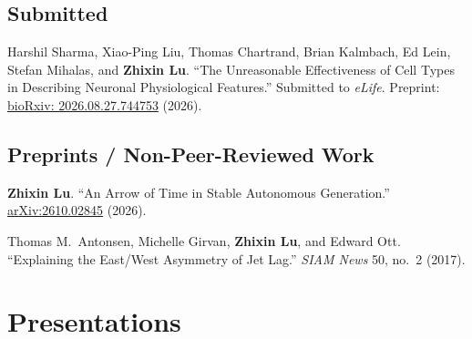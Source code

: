\documentclass[11pt]{article}
\newenvironment{publist}{%
  \begin{list}{}{%
    \setlength{\leftmargin}{2.4em}%
    \setlength{\labelwidth}{1.9em}%
    \setlength{\labelsep}{0.5em}%
    \setlength{\itemsep}{5pt}%
    \setlength{\parsep}{0pt}%
    \setlength{\topsep}{4pt}%
    \interlinepenalty=10000}}%
  {\end{list}}
\newcommand{\pub}[1]{\item[\textbf{#1.}]}
\let\cvOriginalSection\section
\renewcommand{\section}{\Needspace{5\baselineskip}\cvOriginalSection}
\begin{document}
\subsection*{Submitted}
\begin{publist}
\pub{1} Harshil Sharma, Xiao-Ping Liu, Thomas Chartrand, Brian Kalmbach, Ed Lein, Stefan Mihalas,
  and \textbf{Zhixin Lu}. ``The Unreasonable Effectiveness of Cell Types in Describing
  Neuronal Physiological Features.'' Submitted to \emph{eLife}.
  Preprint: \href{https://doi.org/10.64898/2026.08.27.744753}{bioRxiv: 2026.08.27.744753} (2026).
\end{publist}

\subsection*{Preprints / Non-Peer-Reviewed Work}
\begin{publist}
\pub{2} \textbf{Zhixin Lu}. ``An Arrow of Time in Stable Autonomous Generation.''
  \href{https://arxiv.org/abs/2610.02845}{arXiv:2610.02845} (2026).
\pub{1} Thomas M.\ Antonsen, Michelle Girvan, \textbf{Zhixin Lu}, and Edward Ott.
  ``Explaining the East/West Asymmetry of Jet Lag.'' \emph{SIAM News} 50, no.\ 2 (2017).
\end{publist}

\section{Presentations}
\end{document}
